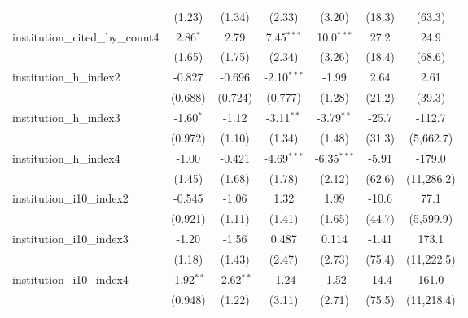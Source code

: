 \begin{tabular}{lcccccc}
                                         & (1.23)        & (1.34)        & (2.33)        & (3.20)        & (18.3)        & (63.3)\\   
   institution\_cited\_by\_count4        & 2.86$^{*}$    & 2.79          & 7.45$^{***}$  & 10.0$^{***}$  & 27.2          & 24.9\\   
                                         & (1.65)        & (1.75)        & (2.34)        & (3.26)        & (18.4)        & (68.6)\\   
   institution\_h\_index2                & -0.827        & -0.696        & -2.10$^{***}$ & -1.99         & 2.64          & 2.61\\   
                                         & (0.688)       & (0.724)       & (0.777)       & (1.28)        & (21.2)        & (39.3)\\   
   institution\_h\_index3                & -1.60$^{*}$   & -1.12         & -3.11$^{**}$  & -3.79$^{**}$  & -25.7         & -112.7\\   
                                         & (0.972)       & (1.10)        & (1.34)        & (1.48)        & (31.3)        & (5,662.7)\\   
   institution\_h\_index4                & -1.00         & -0.421        & -4.69$^{***}$ & -6.35$^{***}$ & -5.91         & -179.0\\   
                                         & (1.45)        & (1.68)        & (1.78)        & (2.12)        & (62.6)        & (11,286.2)\\   
   institution\_i10\_index2              & -0.545        & -1.06         & 1.32          & 1.99          & -10.6         & 77.1\\   
                                         & (0.921)       & (1.11)        & (1.41)        & (1.65)        & (44.7)        & (5,599.9)\\   
   institution\_i10\_index3              & -1.20         & -1.56         & 0.487         & 0.114         & -1.41         & 173.1\\   
                                         & (1.18)        & (1.43)        & (2.47)        & (2.73)        & (75.4)        & (11,222.5)\\   
   institution\_i10\_index4              & -1.92$^{**}$  & -2.62$^{**}$  & -1.24         & -1.52         & -14.4         & 161.0\\   
                                         & (0.948)       & (1.22)        & (3.11)        & (2.71)        & (75.5)        & (11,218.4)\\   

\end{tabular}
